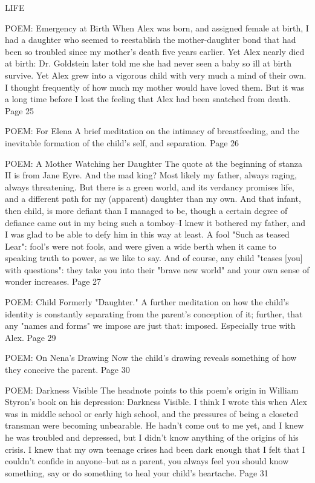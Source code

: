 LIFE 

POEM: Emergency at Birth
When Alex was born, and assigned female at birth, I had a daughter who seemed to reestablish the mother-daughter bond that had been so troubled since my mother's death five years earlier. Yet Alex nearly died at birth: Dr. Goldstein later told me she had never seen a baby so ill at birth survive. Yet Alex grew into a vigorous child with very much a mind of their own. I thought frequently of how much my mother would have loved them. But it was a long time before I lost the feeling that Alex had been snatched from death. Page 25

POEM: For Elena
A brief meditation on the intimacy of breastfeeding, and the inevitable formation of the child's self, and separation. Page 26









POEM: A Mother Watching her Daughter
The quote at the beginning of stanza II is from Jane Eyre. And the mad king? Most likely my father, always raging, always threatening. But there is a green world, and its verdancy promises life, and a different path for my (apparent) daughter than my own. And that infant, then child, is more defiant than I managed to be, though a certain degree of defiance came out in my being such a tomboy--I knew it bothered my father, and I was glad to be able to defy him in this way at least. A fool "Such as teased Lear": fool's were not fools, and were given a wide berth when it came to speaking truth to power, as we like to say. And of course, any child "teases [you] with questions": they take you into their "brave new world" and your own sense of wonder increases. Page 27

POEM: Child
Formerly "Daughter."
A further meditation on how the child's identity is constantly separating from the parent's conception of it; further, that any "names and forms" we impose are just that: imposed. Especially true with Alex. Page 29

POEM: On Nena's Drawing
Now the child's drawing reveals something of how they conceive the parent. 
Page 30

POEM: Darkness Visible
The headnote points to this poem's origin in William Styron's book on his depression: Darkness Visible. I think I wrote this when Alex was in middle school or early high school, and the pressures of being a closeted transman were becoming unbearable. He hadn't come out to me yet, and I knew he was troubled and depressed, but I didn't know anything of the origins of his crisis. I knew that my own teenage crises had been dark enough that I felt that I couldn't confide in anyone--but as a parent, you always feel you should know something, say or do something to heal your child's heartache. Page 31










